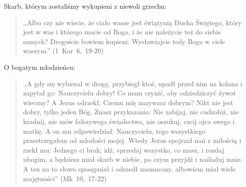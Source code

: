 \documentclass[10pt,a4paper,oneside]{article}
\begin{document}
Skarb, którym zostaliśmy wykupieni z niewoli grzechu:
\begin{quote}
,,Albo czy nie wiecie, że ciało wasze jest świątynią Ducha Świętego, który jest w was i którego macie od Boga, i że nie należycie też do siebie samych? Drogoście bowiem kupieni. Wysławiajcie tedy Boga w ciele waszym.'' \mbox{(1 Kor 6, 19-20)}
\end{quote}

O bogatym młodzieńcu:
\begin{quote}
,,A gdy się wybierał w drogę, przybiegł ktoś, upadł przed nim na kolana i zapytał go: Nauczycielu dobry! Co mam czynić, aby odziedziczyć żywot wieczny? A Jezus odrzekł: Czemu mię nazywasz dobrym? Nikt nie jest dobry, tylko jeden Bóg. Znasz przykazania: Nie zabijaj, nie cudzołóż, nie kradnij, nie mów fałszywego świadectwa, nie oszukuj, czcij ojca swego i matkę. A on mu odpowiedział: Nauczycielu, tego wszystkiego przestrzegałem od młodości mojej. Wtedy Jezus spojrzał nań z miłością i rzekł mu: Jednego ci brak; idź, sprzedaj wszystko, co masz, i rozdaj ubogim, a będziesz miał skarb w niebie, po czym przyjdź i naśladuj mnie. A ten na to słowo sposępniał i odszedł zasmucony, albowiem miał wiele majętności'' \mbox{(Mk 10, 17-22)}
\end{quote}
\end{document}
